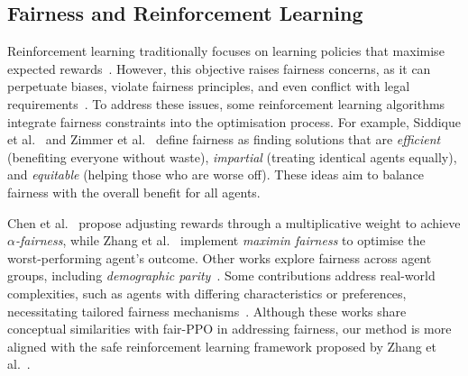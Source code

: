 \subsection{Fairness and Reinforcement Learning}
Reinforcement learning traditionally focuses on learning policies that maximise expected rewards~\cite{Sutton2018}. However, this objective raises fairness concerns, as it can perpetuate biases, violate fairness principles, and even conflict with legal requirements~\cite{Jabbari2017}. To address these issues, some reinforcement learning algorithms integrate fairness constraints into the optimisation process. For example, Siddique et al.~ and Zimmer et al.~ define fairness as finding solutions that are \textit{efficient} (benefiting everyone without waste), \textit{impartial} (treating identical agents equally), and \textit{equitable} (helping those who are worse off). These ideas aim to balance fairness with the overall benefit for all agents.

Chen et al.~ propose adjusting rewards through a multiplicative weight to achieve $\alpha$\textit{-fairness}, while Zhang et al.~ implement \textit{maximin fairness} to optimise the worst-performing agent's outcome. Other works explore fairness across agent groups, including \textit{demographic parity}~\cite{Jiang2019,Wen2021,Chi2022}. Some contributions address real-world complexities, such as agents with differing characteristics or preferences, necessitating tailored fairness mechanisms~\cite{Yu2023,Ju2024}. Although these works share conceptual similarities with fair-PPO in addressing fairness, our method is more aligned with the safe reinforcement learning framework proposed by Zhang et al.~.
